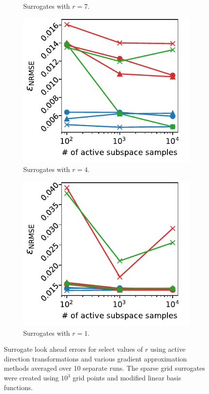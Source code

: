 \documentclass[
  a4paper,  %
  twoside,  %
  bibliography=totoc,
  headsepline,
  cleardoublepage=empty,
  parskip=half,
  draft=false
]{scrbook}
\begin{document}
\begin{mdframed}[style=style]
\begin{figure}[H]
\begin{subfigure}{.5\textwidth}
	\caption{Surrogates with $r=7$.}
	\label{fig:ishigami_as_3}
\end{subfigure}\vspace{4mm}
\begin{subfigure}{.5\textwidth}
  \centering
   \includegraphics[width=\linewidth]{graphics/ww_as_4}
	\caption{Surrogates with $r=4$.}
	\label{fig:ishigami_as_2}
\end{subfigure}
\begin{subfigure}{.5\textwidth}
  \centering
   \includegraphics[width=\linewidth]{graphics/ww_as_1}
	\caption{Surrogates with $r=1$.}
	\label{fig:ishigami_as_1}
\end{subfigure}\vspace{4mm}
\delimit
	\caption{Surrogate look ahead errors for select values of $r$ using active direction transformations and various gradient approximation methods averaged over 10 separate runs.
	The sparse grid surrogates were created using $10^3$ grid points and modified linear basis functions.}
	\label{fig:ishigami_as}
\end{figure}
\end{mdframed}
\end{document}

